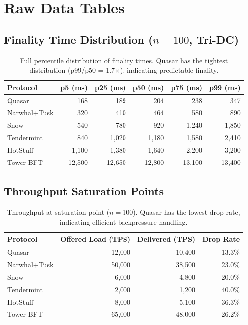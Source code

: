 \section{Raw Data Tables}

\label{app:raw}

\subsection{Finality Time Distribution ($n=100$, Tri-DC)}

\begin{table}[h]
\centering
\small
\begin{tabular}{@{}lrrrrr@{}}
\toprule
\textbf{Protocol} & \textbf{p5 (ms)} & \textbf{p25 (ms)} & \textbf{p50 (ms)} & \textbf{p75 (ms)} & \textbf{p99 (ms)} \\
\midrule
Quasar        & 168   & 189   & 204   & 238   & 347 \\
Narwhal+Tusk  & 320   & 410   & 464   & 580   & 890 \\
Snow          & 540   & 780   & 920   & 1{,}240 & 1{,}850 \\
Tendermint    & 840   & 1{,}020 & 1{,}180 & 1{,}580 & 2{,}410 \\
HotStuff      & 1{,}100 & 1{,}380 & 1{,}640 & 2{,}200 & 3{,}200 \\
Tower BFT     & 12{,}500 & 12{,}650 & 12{,}800 & 13{,}100 & 13{,}400 \\
\bottomrule
\end{tabular}
\caption{Full percentile distribution of finality times. Quasar has the tightest
distribution (p99/p50 = 1.7$\times$), indicating predictable finality.}
\label{tab:finality-raw}
\end{table}

\subsection{Throughput Saturation Points}

\begin{table}[h]
\centering
\begin{tabular}{@{}lrrr@{}}
\toprule
\textbf{Protocol} & \textbf{Offered Load (TPS)} & \textbf{Delivered (TPS)} & \textbf{Drop Rate} \\
\midrule
Quasar        & 12{,}000 & 10{,}400 & 13.3\% \\
Narwhal+Tusk  & 50{,}000 & 38{,}500 & 23.0\% \\
Snow          & 6{,}000  & 4{,}800  & 20.0\% \\
Tendermint    & 2{,}000  & 1{,}200  & 40.0\% \\
HotStuff      & 8{,}000  & 5{,}100  & 36.3\% \\
Tower BFT     & 65{,}000 & 48{,}000 & 26.2\% \\
\bottomrule
\end{tabular}
\caption{Throughput at saturation point ($n=100$). Quasar has the lowest drop rate,
indicating efficient backpressure handling.}
\label{tab:saturation}
\end{table}

